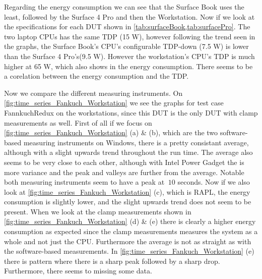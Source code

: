 

Regarding the energy consumption we can see that the Surface Book uses the least, followed by the Surface 4 Pro and then the Workstation. Now if we look at the specifications for each DUT shown in \cref{tab:surfaceBook,tab:surfacePro}. The two laptop CPUs has the same TDP (15 W), however following the trend seen in the graphs, the Surface Book's CPU's configurable TDP-down (7.5 W) is lower than the Surface 4 Pro's(9.5 W). However the workstation's CPU's TDP is much higher at 65 W, which also shows in the energy consumption. There seems to be a corelation between the energy consumption and the TDP.\nytafsnit


Now we compare the different measuring instruments. On \cref{fig:time_series_Fankuch_Workstation} we see the graphs for test case FannkuchRedux on the workstations, since this DUT is the only DUT with clamp measurements as well. First of all if we focus on \cref{fig:time_series_Fankuch_Workstation} (a) \& (b), which are the two software-based measuring instruments on Windows, there is a pretty consistant average, although with a slight upwards trend throughout the run time. The average also seems to be very close to each other, although with Intel Power Gadget the is more variance and the peak and valleys are further from the average. Notable both measuring instruments seem to have a peak at $~10$ seconds. Now if we also look at \cref{fig:time_series_Fankuch_Workstation} (c), which is RAPL, the energy consumption is slightly lower, and the slight upwards trend does not seem to be present. When we look at the clamp measurements shown in \cref{fig:time_series_Fankuch_Workstation} (d) \& (e) there is clearly a higher energy consumption as expected since the clamp measurements measures the system as a whole and not just the CPU. Furthermore the average is not as straight as with the software-based measurements. In \cref{fig:time_series_Fankuch_Workstation} (e) there is pattern where there is a sharp peak followed by a sharp drop. Furthermore, there seems to missing some data.










